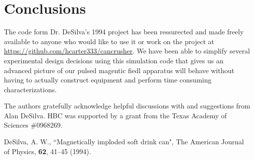 \documentclass[prb,preprint]{revtex4-1}
\begin{document}
\section{Conclusions}
The code form Dr. DeSilva's 1994 project has been ressurected and made freely available to anyone who would like to use it or work on the project at \url{https://github.com/hcarter333/cancrusher}.  We have been able to simplify several experimental design decisions using this simulation code that gives us an advanced picture of our pulsed magentic fiedl apparatus will behave without having to actually construct equipment and perform time consuming characterizations.

\begin{acknowledgments}
The authors gratefully acknowledge helpful discussions with and suggestions from Alan DeSilva.  HBC was supported by a grant from the Texas Academy of Sciences \#0968269.\end{acknowledgments}

\begin{thebibliography}{99}

 DeSilva, A. W., ``Magnetically imploded soft drink can", The American Journal of Physics, \textbf{62}, 41--45 (1994).  



\end{thebibliography}


\end{document}
